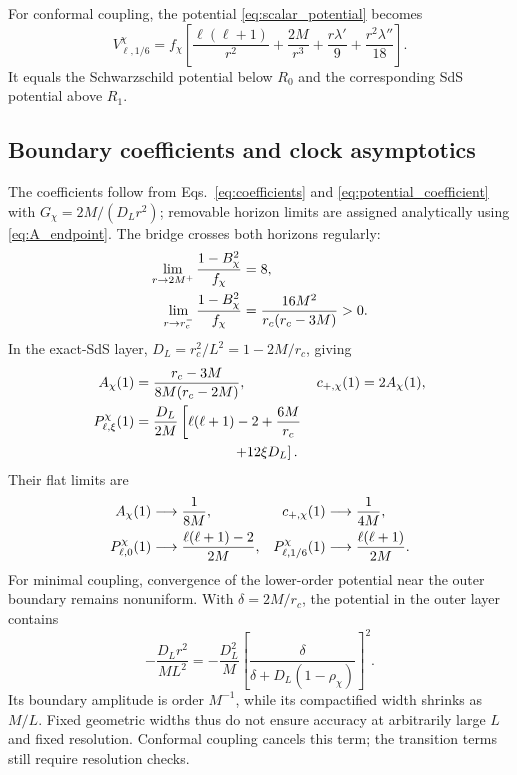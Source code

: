 \documentclass[
 aps,
 prd,
 reprint,
 superscriptaddress,
 nofootinbib,
 longbibliography
]{revtex4-2}
\begin{document}
For conformal coupling, the potential \eqref{eq:scalar_potential} becomes
\begin{equation}
 V_{\ell,1/6}^\chi=f_\chi\left[
 \frac{\ell(\ell+1)}{r^2}+\frac{2M}{r^3}
 +\frac{r\lambda'}{9}+\frac{r^2\lambda''}{18}\right].
 \label{eq:exterior_conformal_scalar_potential}
\end{equation}
It equals the Schwarzschild potential below $R_0$ and the corresponding
SdS potential above $R_1$.  

\subsection{Boundary coefficients and clock asymptotics}

The coefficients follow from Eqs.~\eqref{eq:coefficients} and
\eqref{eq:potential_coefficient} with $G_\chi=2M/(D_Lr^2)$; removable
horizon limits are assigned analytically using \eqref{eq:A_endpoint}.
The bridge crosses both horizons regularly:
\begin{align}
 \lim_{r\to2M^+}\frac{1-B_\chi^2}{f_\chi}&=8,\notag\\
 \lim_{r\to r_c^-}\frac{1-B_\chi^2}{f_\chi}
 &=\frac{16M^2}{r_c(r_c-3M)}>0.
 \label{eq:exterior_bridge_regular_limits}
\end{align}
In the exact-SdS layer, $D_L=r_c^2/L^2=1-2M/r_c$, giving
\begin{align}
 A_\chi(1)&=\frac{r_c-3M}{8M(r_c-2M)},&
 c_{+,\chi}(1)&=2A_\chi(1),\notag\\
 P^\chi_{\ell,\xi}(1)&=\frac{D_L}{2M}
 \left[\ell(\ell+1)-2+\frac{6M}{r_c}\right.\notag\\
 &\left.\hspace{7em}+12\xi D_L\right].
 \label{eq:exterior_outer_endpoint_coefficients}
\end{align}
Their flat limits are
\begin{align}
 A_\chi(1)&\longrightarrow\frac{1}{8M},&
 c_{+,\chi}(1)&\longrightarrow\frac{1}{4M},\notag\\
 P^\chi_{\ell,0}(1)&\longrightarrow
 \frac{\ell(\ell+1)-2}{2M},&
 P^\chi_{\ell,1/6}(1)&\longrightarrow
 \frac{\ell(\ell+1)}{2M}.
 \label{eq:exterior_outer_endpoint_flat_limit}
\end{align}
For minimal coupling, convergence of the lower-order potential near the
outer boundary remains nonuniform.  With $\delta=2M/r_c$, the potential in
the outer layer contains
\begin{equation}
 -\frac{D_Lr^2}{ML^2}
 =-\frac{D_L^2}{M}
 \left[\frac{\delta}{\delta+D_L(1-\rho_\chi)}\right]^2.
 \label{eq:exterior_cap_boundary_layer}
\end{equation}
Its boundary amplitude is order $M^{-1}$, while its compactified width
shrinks as $M/L$.  Fixed geometric widths thus do not ensure accuracy at
arbitrarily large $L$ and fixed resolution.  Conformal coupling cancels
this term; the transition terms still require resolution checks.
\end{document}
